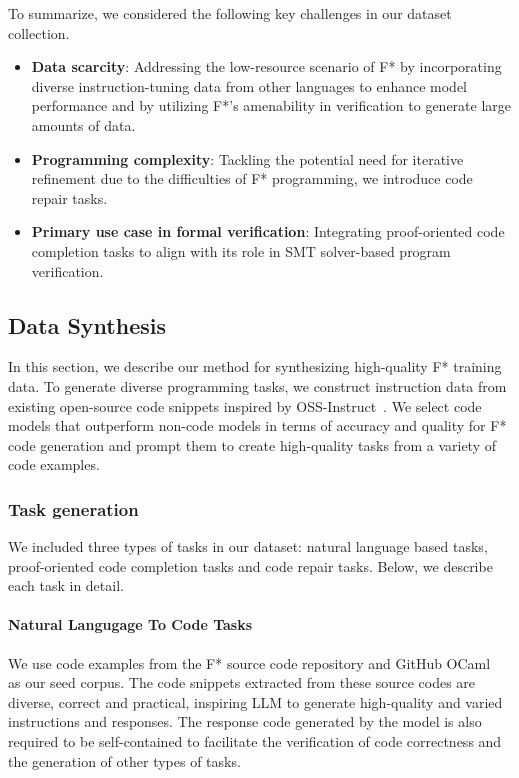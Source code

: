 To summarize, we considered the following key challenges in our dataset collection.

\begin{itemize}
\item  \textbf{Data scarcity}: Addressing the low-resource scenario of F* by incorporating diverse instruction-tuning data from other languages to enhance model performance and by utilizing F*’s amenability in verification to generate large amounts of data.
\item \textbf{Programming complexity}: Tackling the potential need for iterative refinement due to the difficulties of F* programming, we introduce code repair tasks.
\item \textbf{Primary use case in formal verification}: Integrating proof-oriented code completion tasks to align with its role in SMT solver-based program verification. 
\end{itemize}



\subsection{Data Synthesis}
In this section, we describe our method for synthesizing high-quality F* training data. To generate diverse programming tasks, we construct instruction data from existing open-source code snippets inspired by OSS-Instruct~\cite{wei2024magicoder}. We select code models that outperform non-code models in terms of accuracy and quality for F* code generation and prompt them to create high-quality tasks from a variety of code examples.



\subsubsection{Task generation}
We included three types of tasks in our dataset: natural language based tasks, proof-oriented code completion tasks and code repair tasks. Below, we describe each task in detail.

\paragraph{Natural Langugage To Code Tasks}

We use code examples from the F* source code repository and GitHub OCaml ~\cite {ocamlgithub} as our seed corpus.  The code snippets extracted from these source codes are diverse, correct and practical, inspiring LLM to generate high-quality and varied instructions and responses. The response code generated by the model is also required to be self-contained to facilitate the verification of code correctness and the generation of other types of tasks. 

